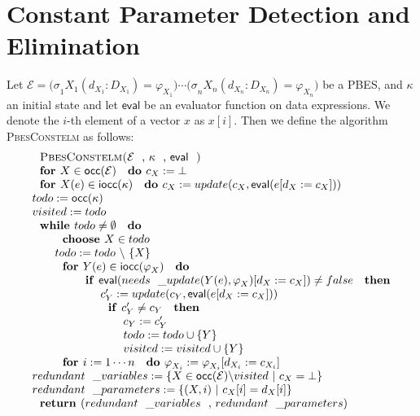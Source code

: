 \documentclass{article}
\begin{document}
\newpage 

\section{Constant Parameter Detection and Elimination}

Let $\mathcal{E=(\sigma }_{1}X_{1}(d_{X_{1}}:D_{X_{1}})=\varphi
_{X_{1}})\cdots \mathcal{(\sigma }_{n}X_{n}(d_{X_{n}}:D_{X_{n}})=\varphi
_{X_{n}})$ be a PBES, and $\kappa $ an initial state and let $\mathsf{eval}$
be an evaluator function on data expressions. We denote the $i$-th element
of a vector $x$ as $x[i]$. Then we define the algorithm \textsc{PbesConstelm}
as follows:$\qquad \qquad $%
\begin{equation*}
\begin{array}{l}
\text{\textsc{PbesConstelm(}}\mathcal{E}\text{, }\kappa \text{, }\mathsf{eval%
}\text{\textsc{)}} \\ 
\text{\textbf{for }}X\in \mathsf{occ}(\mathcal{E)}\text{ \textbf{do }}%
c_{X}:=\bot \\ 
\text{\textbf{for }}X(e)\in \mathsf{iocc}(\kappa \mathcal{)}\text{ \textbf{%
do }}c_{X}:=update(c_{X},\mathsf{eval}(e[d_{X}:=c_{X}])) \\ 
todo:=\mathsf{occ}(\kappa \mathcal{)} \\ 
visited:=todo \\ 
\text{\textbf{while }}todo\neq \emptyset \text{ \textbf{do}} \\ 
\qquad \text{\textbf{choose }}X\in todo \\ 
\qquad todo:=todo\ \backslash \ \{X\} \\ 
\qquad \text{\textbf{for }}Y(e)\in \mathsf{iocc}(\varphi _{X}\mathcal{)}%
\text{ \textbf{do}} \\ 
\qquad \qquad \text{\textbf{if }}\mathsf{eval}(needs\_update(Y(e),\varphi
_{X})[d_{X}:=c_{X}])\neq false\text{ \textbf{then}} \\ 
\qquad \qquad \qquad c_{Y}^{\prime }:=update(c_{Y},\mathsf{eval}%
(e[d_{X}:=c_{X}])) \\ 
\qquad \qquad \qquad \text{\textbf{if }}c_{Y}^{\prime }\neq c_{Y}\text{ 
\textbf{then}} \\ 
\qquad \qquad \qquad \qquad c_{Y}:=c_{Y}^{\prime } \\ 
\qquad \qquad \qquad \qquad todo:=todo\cup \{Y\} \\ 
\qquad \qquad \qquad \qquad visited:=visited\cup \{Y\} \\ 
\qquad \text{\textbf{for }}i:=1\cdots n\text{ \textbf{do }}\varphi
_{X_{i}}:=\varphi _{X_{i}}[d_{X_{i}}:=c_{X_{i}}] \\ 
redundant\_variables:=\{X\in \mathsf{occ}(\mathcal{E)\setminus }visited\ |\
c_{X}=\bot \} \\ 
redundant\_parameters:=\{(X,i)\ |\ c_{X}[i]=d_{X}[i]\} \\ 
\text{\textbf{return }}(redundant\_variables\text{, }redundant\_parameters)%
\end{array}%
\end{equation*}
\end{document}

